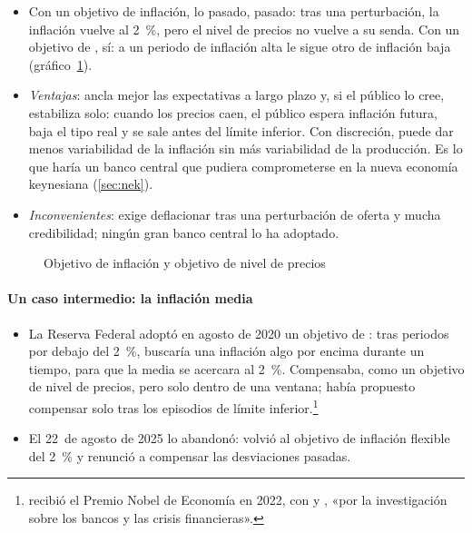\documentclass[11pt]{article}
\begin{document}
\begin{itemize}
\item Con un objetivo de inflación, lo pasado, pasado: tras una perturbación, la inflación vuelve al 2~\%, pero el nivel de precios no vuelve a su senda. Con un objetivo de , sí: a un periodo de inflación alta le sigue otro de inflación baja (gráfico~\ref{fig:objetivo-precios}).
\item \emph{Ventajas}: ancla mejor las expectativas a largo plazo y, si el público lo cree, estabiliza solo: cuando los precios caen, el público espera inflación futura, baja el tipo real y se sale antes del límite inferior. Con discreción, puede dar menos variabilidad de la inflación sin más variabilidad de la producción\nocite{Svensson1999Price}. Es lo que haría un banco central que pudiera comprometerse en la nueva economía keynesiana (\ref{sec:nek}).
\item \emph{Inconvenientes}: exige deflacionar tras una perturbación de oferta y mucha credibilidad; ningún gran banco central lo ha adoptado\nocite{MinfordHatcher2014}.
\end{itemize}

\begin{figure}[H]
\centering
\caption{Objetivo de inflación y objetivo de nivel de precios}\label{fig:objetivo-precios}
\end{figure}

\paragraph{Un caso intermedio: la inflación media}

\begin{itemize}
\item La Reserva Federal adoptó en agosto de 2020 un objetivo de : tras periodos por debajo del 2~\%, buscaría una inflación algo por encima durante un tiempo, para que la media se acercara al 2~\%\nocite{Fed2020Prensa}. Compensaba, como un objetivo de nivel de precios, pero solo dentro de una ventana; \textcite{Bernanke2017Temporary} había propuesto compensar solo tras los episodios de límite inferior.\footnote{ recibió el Premio Nobel de Economía en 2022, con  y , «por la investigación sobre los bancos y las crisis financieras»\nocite{Nobel2022}.}
\item El 22~de agosto de 2025 lo abandonó: volvió al objetivo de inflación flexible del 2~\% y renunció a compensar las desviaciones pasadas\nocite{Fed2025Prensa,Powell2025Jackson}.
\end{itemize}
\end{document}
